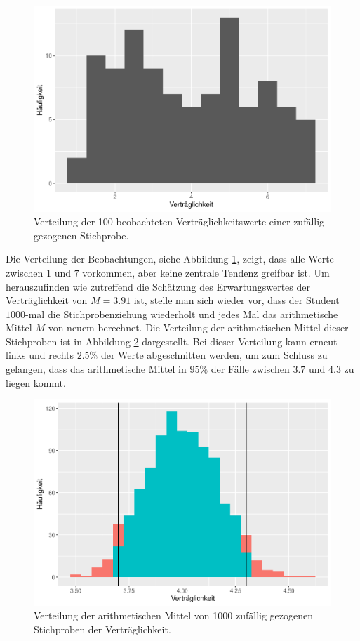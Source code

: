 \documentclass[
]{book}
\theoremstyle{definition}
\theoremstyle{definition}
\theoremstyle{definition}
\theoremstyle{definition}
\theoremstyle{remark}
\begin{document}
\begin{figure}
\centering
\includegraphics{aps_statistik1_files/figure-latex/exm-agreableness-hist-1.pdf}
\caption{\label{fig:exm-agreableness-hist}Verteilung der 100 beobachteten Verträglichkeitswerte einer zufällig gezogenen Stichprobe.}
\end{figure}

Die Verteilung der Beobachtungen, siehe Abbildung \ref{fig:exm-agreableness-hist}, zeigt, dass alle Werte zwischen \(1\) und \(7\) vorkommen, aber keine zentrale Tendenz greifbar ist. Um herauszufinden wie zutreffend die Schätzung des Erwartungswertes der Verträglichkeit von \(M=3.91\) ist, stelle man sich wieder vor, dass der Student \(1000\)-mal die Stichprobenziehung wiederholt und jedes Mal das arithmetische Mittel \(M\) von neuem berechnet. Die Verteilung der arithmetischen Mittel dieser Stichproben ist in Abbildung \ref{fig:exm-agreableness-hist-means} dargestellt. Bei dieser Verteilung kann erneut links und rechts \(2.5\%\) der Werte abgeschnitten werden, um zum Schluss zu gelangen, dass das arithmetische Mittel in \(95\%\) der Fälle zwischen \(3.7\) und \(4.3\) zu liegen kommt.

\begin{figure}
\centering
\includegraphics{aps_statistik1_files/figure-latex/exm-agreableness-hist-means-1.pdf}
\caption{\label{fig:exm-agreableness-hist-means}Verteilung der arithmetischen Mittel von 1000 zufällig gezogenen Stichproben der Verträglichkeit.}
\end{figure}
\end{document}
